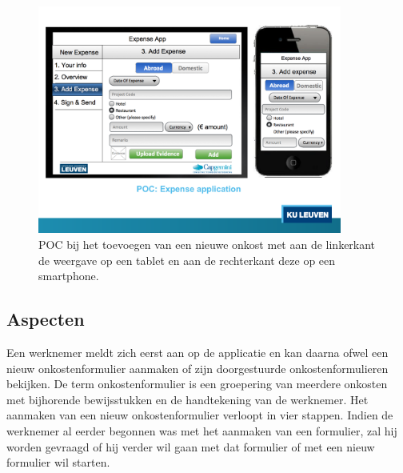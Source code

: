 \begin{figure}
  \centering
  \includegraphics[trim=0cm 4cm 0cm 1.25cm,clip=true,height=7.5cm]{figuren/poc.pdf}
  \caption{POC bij het toevoegen van een nieuwe onkost met aan de linkerkant de weergave op een tablet en aan de rechterkant deze op een smartphone.}
  \label{fig:poc}
\end{figure}

\subsection{Aspecten}
\label{sec:vergelijking-poc-detail}

Een werknemer meldt zich eerst aan op de applicatie en kan daarna ofwel een nieuw onkostenformulier aanmaken of zijn doorgestuurde onkostenformulieren bekijken.
De term onkostenformulier is een groepering van meerdere onkosten met bijhorende bewijsstukken en de handtekening van de werknemer. 
Het aanmaken van een nieuw onkostenformulier verloopt in vier stappen.
Indien de werknemer al eerder begonnen was met het aanmaken van een formulier, zal hij worden gevraagd of hij verder wil gaan met dat formulier of met een nieuw formulier wil starten.


